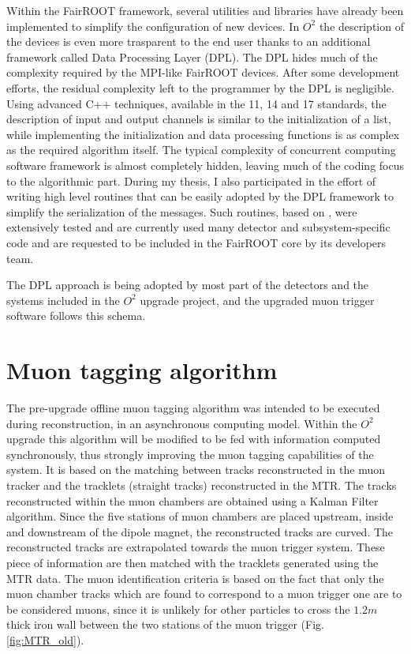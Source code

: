 Within the FairROOT framework, several utilities and libraries have already been implemented to simplify the configuration of new devices.
In $O^2$ the description of the devices is even more trasparent to the end user thanks to an additional framework called Data Processing Layer (DPL).
The DPL hides much of the complexity required by the MPI-like FairROOT devices.
After some development efforts, the residual complexity left to the programmer by the DPL is negligible.
Using advanced C++ techniques, available in the 11, 14 and 17 standards, the description of input and output channels is similar to the initialization of a list, while implementing the initialization and data processing functions is as complex as the required algorithm itself.
The typical complexity of concurrent computing software framework is almost completely hidden, leaving much of the coding focus to the algorithmic part.
During my thesis, I also participated in the effort of writing high level routines that can be easily adopted by the DPL framework to simplify the serialization of the messages. 
Such routines, based on , were extensively tested and are currently used many detector and subsystem-specific code and are requested to be included in the FairROOT core by its developers team.

The DPL approach is being adopted by most part of the detectors and the systems included in the $O^2$ upgrade project, and the upgraded muon trigger software follows this schema.

\section{Muon tagging algorithm}
\label{MTR_tagging}
The pre-upgrade offline muon tagging algorithm was intended to be executed during reconstruction, in an asynchronous computing model.
Within the $O^2$ upgrade this algorithm will be modified to be fed with information computed synchronously, thus strongly improving the muon tagging capabilities of the system.
It is based on the matching between tracks reconstructed in the muon tracker and the tracklets (straight tracks) reconstructed in the MTR.
The tracks reconstructed within the muon chambers are obtained using a Kalman Filter algorithm.
Since the five stations of muon chambers are placed upstream, inside and downstream of the dipole magnet, the reconstructed tracks are curved.
The reconstructed tracks are extrapolated towards the muon trigger system.
These piece of information are then matched with the tracklets generated using the MTR data.
The muon identification criteria is based on the fact that only the muon chamber tracks which are found to correspond to a muon trigger one are to be considered muons, since it is unlikely for other particles to cross the $1.2m$ thick iron wall between the two stations of the muon trigger (Fig. \ref{fig:MTR_old}).

